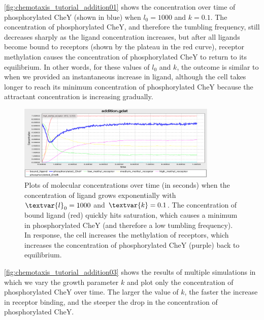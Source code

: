 \autoref{fig:chemotaxis_tutorial_addition01} shows the concentration over time of phosphorylated CheY (shown in blue) when $l_0 = 1000$ and $k = 0.1$. The concentration of phosphorylated CheY, and therefore the tumbling frequency, still decreases sharply as the ligand concentration increases, but after all ligands become bound to receptors (shown by the plateau in the red curve), receptor methylation causes the concentration of phosphorylated CheY to return to its equilibrium. In other words, for these values of $l_0$ and $k$, the outcome is similar to when we provided an instantaneous increase in ligand, although the cell takes longer to reach its minimum concentration of phosphorylated CheY because the attractant concentration is increasing gradually.\\

\begin{figure}[h]
\centering
\mySfFamily
\includegraphics[width = 0.85\textwidth]{../images/chemotaxis_tutorial_addition01.png}
\caption{Plots of molecular concentrations over time (in seconds) when the concentration of ligand grows exponentially with $\textvar{l}_\text{0} = \text{1000}$ and $\textvar{k} = \text{0.1}$. The concentration of bound ligand (red) quickly hits saturation, which causes a minimum in phosphorylated CheY (and therefore a low tumbling frequency). In response, the cell increases the methylation of receptors, which increases the concentration of phosphorylated CheY (purple) back to equilibrium.}
\label{fig:chemotaxis_tutorial_addition01}
\end{figure}

\autoref{fig:chemotaxis_tutorial_addition03} shows the results of multiple simulations in which we vary the growth parameter $k$ and plot only the concentration of phosphorylated CheY over time. The larger the value of $k$, the faster the increase in receptor binding, and the steeper the drop in the concentration of phosphorylated CheY.

